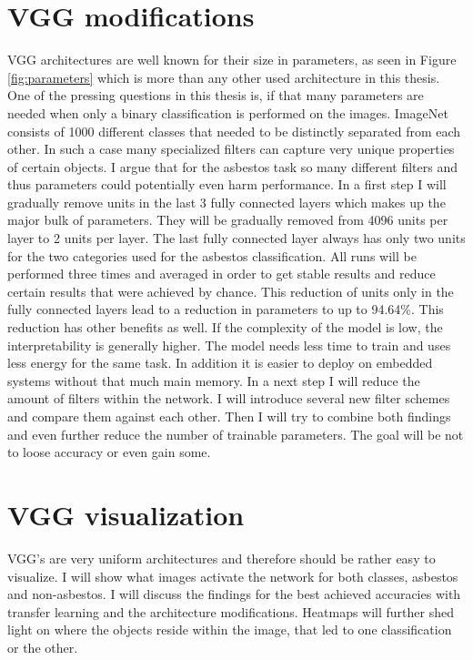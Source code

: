 \section{VGG modifications}

VGG architectures are well known for their size in parameters, as seen in Figure \ref{fig:parameters} which is more than any other used architecture in this thesis. One of the pressing questions in this thesis is, if that many parameters are needed when only a binary classification is performed on the images. ImageNet consists of 1000 different classes that needed to be distinctly separated from each other. In such a case many specialized filters can capture very unique properties of certain objects. I argue that for the asbestos task so many different filters and thus parameters could  potentially even harm performance. In a first step I will gradually remove units in the last 3 fully connected layers which makes up the major bulk of parameters. They will be gradually removed from 4096 units per  layer to 2 units per layer. The last fully connected layer always has only two units for the two categories used for the asbestos classification. All runs will be performed  three times  and averaged in order to get stable results and reduce certain results that were achieved by chance.  This reduction of units only in the fully connected layers lead to a reduction in parameters to up to 94.64\%. This reduction has other benefits as well. If the complexity of the model is low, the interpretability is generally higher. The model needs less time to train and uses less energy for the same task.  In addition it is easier to deploy on embedded systems without that much main memory. In a next step I will reduce the amount of filters within the network. I will introduce several new filter schemes and compare them against each other. Then I will try to combine both findings and even further reduce the number of trainable parameters. The goal will be not to loose accuracy or even gain some.\\

\section{VGG visualization}

VGG's are very uniform architectures and therefore should be rather easy to visualize. I will show what images activate the network for both  classes, asbestos and non-asbestos. I will discuss the findings for the best achieved accuracies with transfer  learning and the architecture modifications. Heatmaps will further shed light on where the objects reside within the  image, that led to one classification or the other. 

